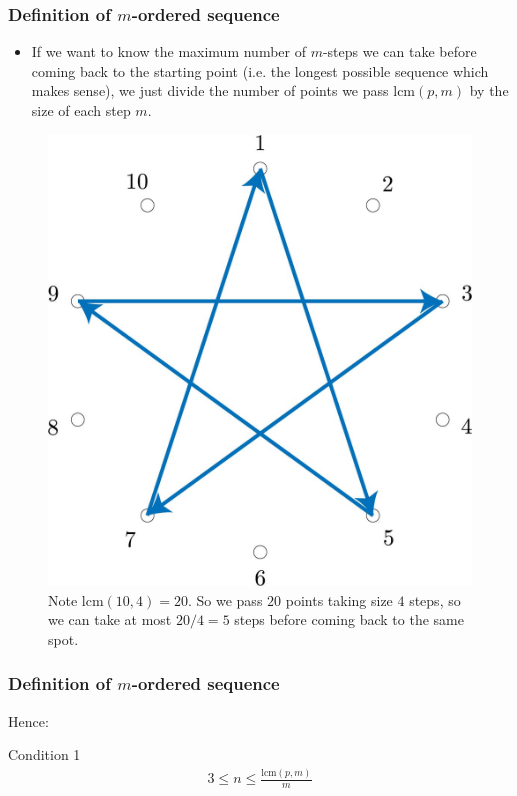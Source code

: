 \documentclass{beamer}
\theoremstyle{plain}
\theoremstyle{definition}
\theoremstyle{remark}
\newcommand{\bee}{\begin{equation}\begin{aligned}}
\newcommand{\eee}{\end{aligned}\end{equation}}
\newcommand{\fracc}{\frac}				%
\newcommand{\lcm}{\mathrm{lcm}}
\renewcommand{\leq}{\leqslant}			%
\renewcommand{\'}{\hspace{0.5mm}'}		%
\begin{document}
\begin{frame}
\frametitle{Definition of $m$-ordered sequence}
	\begin{itemize}
		\item If we want to know the maximum number
		of $m$-steps we can take before coming back
		to the starting point (i.e. the longest 
		possible sequence which makes sense), 
		we just divide the number of points we pass
		$\lcm(p,m)$ by the size of each step $m$. 
	\end{itemize}
	\begin{figure}
		\includegraphics[scale=0.08]{circ_10_4.jpg}
		\caption{Note $\lcm(10,4) = 20$. So we pass 
		$20$ points taking size $4$ steps, so 
		we can take at most $20/4 = 5$ steps before
		coming back to the same spot. }
	\end{figure}
	
\end{frame}


\begin{frame}
\frametitle{Definition of $m$-ordered sequence}
	Hence:
	\begin{block}{Condition 1}
		\bee
			3 \leq n \leq \fracc{\mathrm{lcm}(p,m)}{m}
		\eee
	\end{block}
	
\end{frame}
\end{document}
